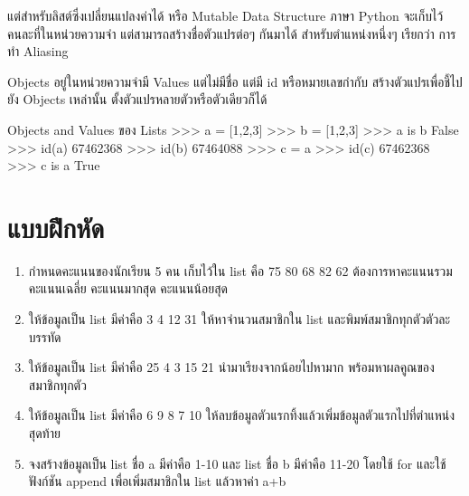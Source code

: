 แต่สำหรับลิสต์ซึ่งเปลี่ยนแปลงค่าได้ หรือ Mutable Data Structure ภาษา Python จะเก็บไว้คนละที่ในหน่วยความจำ แต่สามารถสร้างชื่อตัวแปรต่อๆ กันมาได้ สำหรับตำแหน่งหนึ่งๆ เรียกว่า การทำ Aliasing

Objects อยู่ในหน่วยความจำมี Values แต่ไม่มีชื่อ แต่มี id หรือหมายเลขกำกับ สร้างตัวแปรเพื่อชี้ไปยัง Objects เหล่านั้น ตั้งตัวแปรหลายตัวหรือตัวเดียวก็ได้

\begin{codelist}{Objects and Values ของ Lists}{}
>>> a = [1,2,3]
>>> b = [1,2,3]
>>> a is b
False
>>> id(a)
67462368
>>> id(b)
67464088
>>> c = a
>>> id(c)
67462368
>>> c is a
True
\end{codelist}


\section{แบบฝึกหัด}
\begin{enumerate} 
\item กำหนดคะแนนของนักเรียน 5 คน เก็บไว้ใน list คือ 75 80 68 82 62 ต้องการหาคะแนนรวม คะแนนเฉลี่ย คะแนนมากสุด คะแนนน้อยสุด 
\item ให้ข้อมูลเป็น list มีค่าคือ 3 4 12 31 ให้หาจำนวนสมาชิกใน list  และพิมพ์สมาชิกทุกตัวตัวละบรรทัด
\item ให้ข้อมูลเป็น list มีค่าคือ 25 4 3 15 21 นำมาเรียงจากน้อยไปหามาก พร้อมหาผลคูณของสมาชิกทุกตัว
\item ให้ข้อมูลเป็น list มีค่าคือ 6 9 8 7 10 ให้ลบข้อมูลตัวแรกทิ้งแล้วเพิ่มข้อมูลตัวแรกไปที่ตำแหน่งสุดท้าย
\item จงสร้างข้อมูลเป็น list ชื่อ a มีค่าคือ 1-10 และ list ชื่อ b มีค่าคือ 11-20 โดยใช้ for และใช้ฟังก์ชัน append เพื่อเพิ่มสมาชิกใน list แล้วหาค่า a+b
\end{enumerate}


